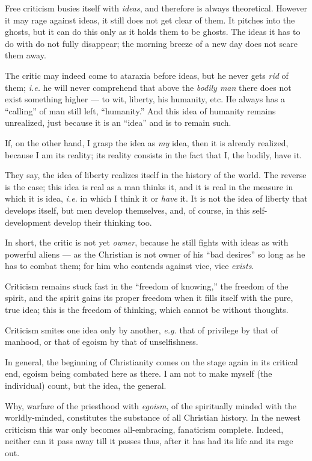 Free criticism busies itself with \textit{ideas}, and therefore is always 
theoretical. However it may rage against ideas, it still does not get clear of 
them. It pitches into the ghosts, but it can do this only as it holds them to 
be ghosts. The ideas it has to do with do not fully disappear; the morning 
breeze of a new day does not scare them away.

The critic may indeed come to ataraxia before ideas, but he never gets 
\textit{rid} of them; \textit{i.e.} he will never comprehend that above the 
\textit{bodily man} there does not exist something higher --- to wit, liberty, 
his humanity, etc. He always has a ``calling'' of man still left, 
``humanity.'' And this idea of humanity remains unrealized, just because it 
is an ``idea'' and is to remain such.

If, on the other hand, I grasp the idea as \textit{my} idea, then it is 
already realized, because I am its reality; its reality consists in the fact 
that I, the bodily, have it.

They say, the idea of liberty realizes itself in the history of the world. The 
reverse is the case; this idea is real as a man thinks it, and it is real in 
the measure in which it is idea, \textit{i.e.} in which I think it or 
\textit{have} it. It is not the idea of liberty that develops itself, but men 
develop themselves, and, of course, in this self-development develop their 
thinking too.

In short, the critic is not yet \textit{owner}, because he still fights with 
ideas as with powerful aliens --- as the Christian is not owner of his ``bad 
desires'' so long as he has to combat them; for him who contends against 
vice, vice \textit{exists}.

Criticism remains stuck fast in the ``freedom of knowing,'' the freedom of 
the spirit, and the spirit gains its proper freedom when it fills itself with 
the pure, true idea; this is the freedom of thinking, which cannot be without 
thoughts.

Criticism smites one idea only by another, \textit{e.g.} that of privilege by 
that of manhood, or that of egoism by that of unselfishness.

In general, the beginning of Christianity comes on the stage again in its 
critical end, egoism being combated here as there. I am not to make myself 
(the individual) count, but the idea, the general.

Why, warfare of the priesthood with \textit{egoism}, of the spiritually minded 
with the worldly-minded, constitutes the substance of all Christian history. 
In the newest criticism this war only becomes all-embracing, fanaticism 
complete. Indeed, neither can it pass away till it passes thus, after it has 
had its life and its rage out.

